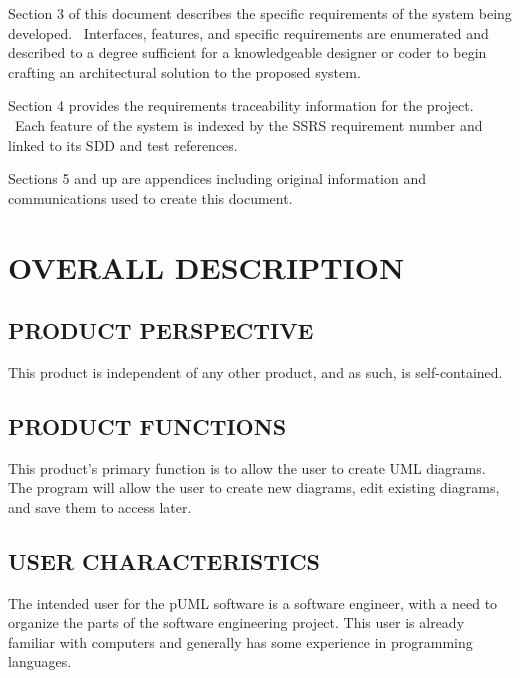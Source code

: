 \documentclass[twoside,letterpaper]{article}
\begin{document}
\bigskip

{
Section 3 of this document describes the specific requirements of the
system being developed. \ Interfaces, features, and specific
requirements are enumerated and described to a degree sufficient for a
knowledgeable designer or coder to begin crafting an architectural
solution to the proposed system.}


\bigskip

{
Section 4 provides the requirements traceability information for the
project. \ Each feature of the system is indexed by the SSRS
requirement number and linked to its SDD and test references.}


\bigskip

{
Sections 5 and up are appendices including original information and
communications used to create this document.}











\clearpage\section[OVERALL DESCRIPTION]{\rmfamily\bfseries
OVERALL DESCRIPTION}

\subsection[PRODUCT PERSPECTIVE]{\rmfamily\bfseries
PRODUCT PERSPECTIVE}
{
This product is independent of any other product, and as such, is self-contained.
}

\subsection[PRODUCT FUNCTIONS]{\rmfamily\bfseries
PRODUCT FUNCTIONS}
{
This product's primary function is to allow the user to create UML diagrams.  
The program will allow the user to create new diagrams, edit existing diagrams, and save them to access later.
}

\subsection[USER CHARACTERISTICS]{\rmfamily\bfseries
USER CHARACTERISTICS}
{
The intended user for the pUML software is a software engineer, with a need to organize
the parts of the software engineering project. This user is already familiar with
computers and generally has some experience in programming languages.
}
\end{document}
